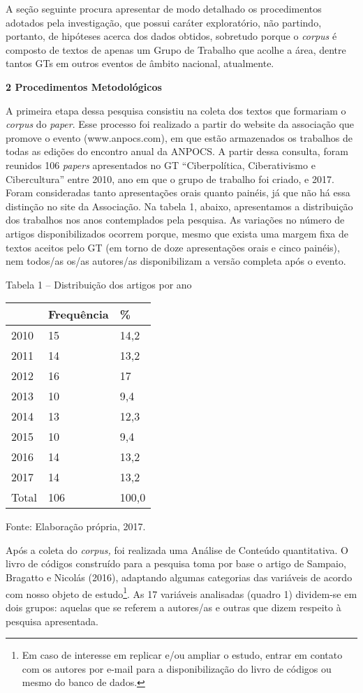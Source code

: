 A seção seguinte procura apresentar de modo detalhado os procedimentos
adotados pela investigação, que possui caráter exploratório, não
partindo, portanto, de hipóteses acerca dos dados obtidos, sobretudo
porque o \emph{corpus} é composto de textos de apenas um Grupo de
Trabalho que acolhe a área, dentre tantos GTs em outros eventos de
âmbito nacional, atualmente.

\textbf{2 Procedimentos Metodológicos }

A primeira etapa dessa pesquisa consistiu na coleta dos textos que
formariam o \emph{corpus} do \emph{paper}. Esse processo foi realizado a
partir do website da associação que promove o evento (www.anpocs.com),
em que estão armazenados os trabalhos de todas as edições do encontro
anual da ANPOCS. A partir dessa consulta, foram reunidos 106
\emph{papers} apresentados no GT ``Ciberpolítica, Ciberativismo e
Cibercultura'' entre 2010, ano em que o grupo de trabalho foi criado, e
2017. Foram consideradas tanto apresentações orais quanto painéis, já
que não há essa distinção no site da Associação. Na tabela 1, abaixo,
apresentamos a distribuição dos trabalhos nos anos contemplados pela
pesquisa. As variações no número de artigos disponibilizados ocorrem
porque, mesmo que exista uma margem fixa de textos aceitos pelo GT (em
torno de doze apresentações orais e cinco painéis), nem todos/as os/as
autores/as disponibilizam a versão completa após o evento.

Tabela 1 -- Distribuição dos artigos por ano

\begin{longtable}[]{@{}lll@{}}
\toprule
& Frequência & \%\tabularnewline
\midrule
\endhead
2010 & 15 & 14,2\tabularnewline
2011 & 14 & 13,2\tabularnewline
2012 & 16 & 17\tabularnewline
2013 & 10 & 9,4\tabularnewline
2014 & 13 & 12,3\tabularnewline
2015 & 10 & 9,4\tabularnewline
2016 & 14 & 13,2\tabularnewline
2017 & 14 & 13,2\tabularnewline
Total & 106 & 100,0\tabularnewline
\bottomrule
\end{longtable}

Fonte: Elaboração própria, 2017.

Após a coleta do \emph{corpus,} foi realizada uma Análise de Conteúdo
quantitativa. O livro de códigos construído para a pesquisa toma por
base o artigo de Sampaio, Bragatto e Nicolás (2016), adaptando algumas
categorias das variáveis de acordo com nosso objeto de estudo\footnote{Em
  caso de interesse em replicar e/ou ampliar o estudo, entrar em contato
  com os autores por e-mail para a disponibilização do livro de códigos
  ou mesmo do banco de dados.}. As 17 variáveis analisadas (quadro 1)
dividem-se em dois grupos: aquelas que se referem a autores/as e outras
que dizem respeito à pesquisa apresentada.

